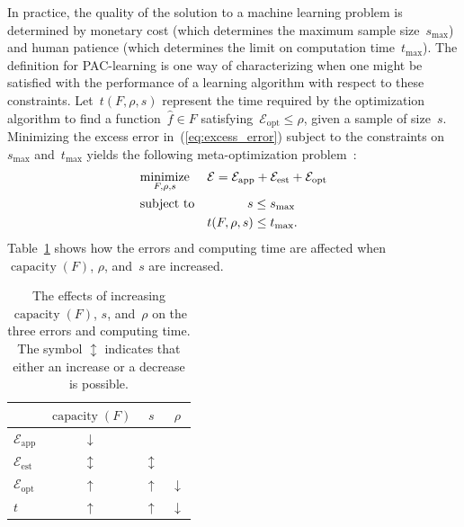 \documentclass[11pt,a4paper]{article}
\numberwithin{equation}{section}
\newcommand{\capacity}{\operatorname{capacity}}
\newcommand{\apperr}{\mathcal{E}_{\mathrm{app}}}
\newcommand{\esterr}{\mathcal{E}_{\mathrm{est}}}
\newcommand{\opterr}{\mathcal{E}_{\mathrm{opt}}}
\begin{document}
In practice, the quality of the solution to a machine learning problem is
determined by monetary cost (which determines the maximum sample
size~$s_{\text{max}}$) and human patience (which determines the limit on
computation time~$t_{\text{max}}$). The definition for PAC-learning is one way
of characterizing when one might be satisfied with the performance of a learning
algorithm with respect to these constraints. Let~$t(F, \rho, s)$ represent the
time required by the optimization algorithm to find a function~$\hat{f} \in F$
satisfying~$\opterr \leq \rho$, given a sample of size~$s$. Minimizing the
excess error in~(\ref{eq:excess_error}) subject to the constraints
on~$s_{\text{max}}$ and~$t_{\text{max}}$ yields the following meta-optimization
problem~\citep{bousquet2008tradeoffs}:
\begin{equation}
\begin{aligned}
	& \underset{F, \rho, s}{\text{minimize}} & &
		\mathcal{E} = \apperr + \esterr + \opterr \\
	& \text{subject to} & & \hspace{3.2em} s \leq s_{\text{max}} \\
	& & & t(F, \rho, s) \leq t_{\text{max}}.
\end{aligned}
\label{eq:metaopt_program}
\end{equation}
Table~\ref{tab:metaopt_variables} shows how the errors and computing time are
affected when $\capacity(F)$, $\rho$, and~$s$ are increased.

\begin{table}
\centering
\begin{tabular}{lccc}
\toprule
& $\capacity(F)$ & $s$ & $\rho$ \\
\midrule
$\apperr$ & $\downarrow$ & \text{---} & \text{---} \\
$\esterr$ & $\updownarrow$ & $\updownarrow$ & \text{---} \\
$\opterr$ & $\uparrow$ & $\uparrow$ & $\downarrow$ \\
$t$ & $\uparrow$ & $\uparrow$ & $\downarrow$ \\
\bottomrule
\end{tabular}
\caption{The effects of increasing $\capacity(F)$, $s$, and~$\rho$ on the three
errors and computing time. The symbol $\updownarrow$ indicates that either an
increase or a decrease is possible.\label{tab:metaopt_variables}}
\end{table}
\end{document}
